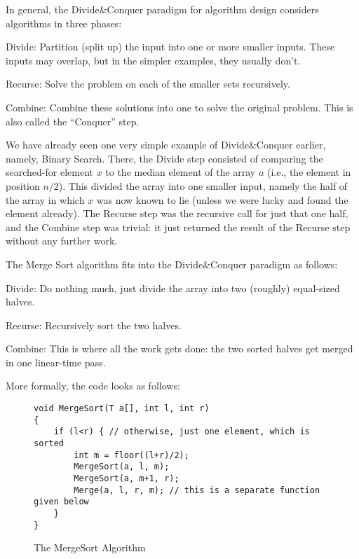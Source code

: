 In general, the Divide\&{}Conquer paradigm for algorithm design
considers algorithms in three phases:
\begin{description}
\item{Divide}: Partition (split up) the input into one or more smaller
  inputs. These inputs may overlap, but in the simpler examples, they
  usually don't.
\item{Recurse}: Solve the problem on each of the smaller sets
  recursively.
\item{Combine}: Combine these solutions into one to solve the original
  problem. This is also called the ``Conquer'' step.
\end{description}

We have already seen one very simple example of Divide\&{}Conquer
earlier, namely, Binary Search. There, the Divide step consisted of
comparing the searched-for element $x$ to the median element of the
array $a$ (i.e., the element in position $n/2$). This divided the
array into one smaller input, namely the half of the array in which
$x$ was now known to lie (unless we were lucky and found the element
already). The Recurse step was the recursive call for just that one
half, and the Combine step was trivial: it just returned the result of
the Recurse step without any further work.

The Merge Sort algorithm fits into the Divide\&{}Conquer paradigm as
follows:
\begin{description}
\item{Divide}: Do nothing much, just divide the array into two
  (roughly) equal-sized halves.
\item{Recurse}: Recursively sort the two halves.
\item{Combine}: This is where all the work gets done: the two sorted
  halves get merged in one linear-time pass.
\end{description}

More formally, the code looks as follows:
\begin{figure}[htb]
\begin{verbatim}
void MergeSort(T a[], int l, int r)
{
    if (l<r) { // otherwise, just one element, which is sorted
        int m = floor((l+r)/2);
        MergeSort(a, l, m);
        MergeSort(a, m+1, r);
        Merge(a, l, r, m); // this is a separate function given below
    }
}
\end{verbatim}
\caption{The MergeSort Algorithm \label{alg:sorting:mergesort}}
\end{figure}


